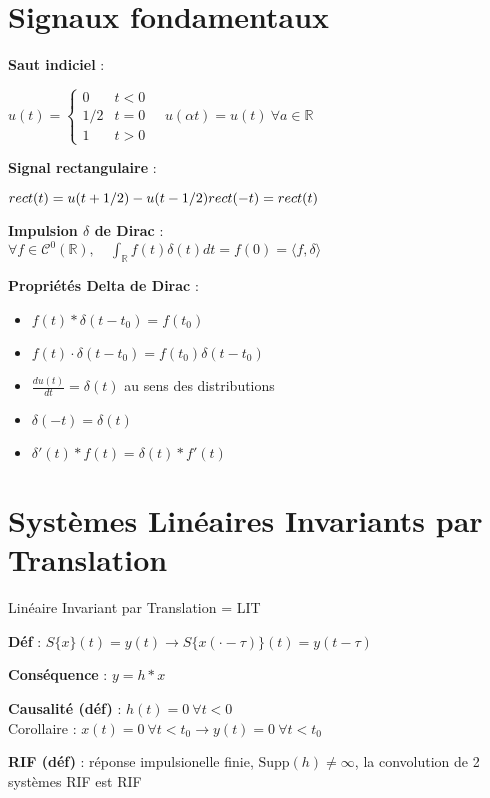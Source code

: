 \section{Signaux fondamentaux}

\textbf{Saut indiciel} : 

$
u(t) = 
\begin{cases}
0 & t < 0 \\
1/2 & t = 0 \\
1 & t > 0
\end{cases}
\quad
u(\alpha t) = u(t) \: \forall a \in \mathbb{R}
$

\textbf{Signal rectangulaire} : 

$
rect(t) = u(t + 1/2) - u(t-1/2)\\
rect(-t) = rect(t)
$

\textbf{Impulsion $\delta$ de Dirac} : \\
$
\forall f \in \mathcal{C}^0 (\mathbb{R}), 
\quad 
\int_\mathbb{R} f(t) \delta(t) dt = f(0) = \langle f, \delta \rangle
$

\textbf{Propriétés Delta de Dirac} : 
\begin{itemize}
    \item $f(t) * \delta(t-t_0) = f(t_0)$
    \item $f(t) \cdot \delta(t-t_0) = f(t_0) \delta(t-t_0)$
    \item $\frac{du(t)}{dt} = \delta(t)$ au sens des distributions
    \item $\delta(-t) = \delta(t)$
    \item $\delta'(t) * f(t) = \delta(t) * f'(t)$
\end{itemize}


\section{Systèmes Linéaires Invariants par Translation}

Linéaire Invariant par Translation = LIT

\textbf{Déf} : $S\{x\}(t) = y(t) \rightarrow S\{x(\cdot - \tau) \}(t) = y(t - \tau)$

\textbf{Conséquence} : $y = h * x$

\textbf{Causalité (déf)} : $h(t) = 0 \: \forall t < 0$\\
Corollaire : $x(t) = 0 \: \forall t < t_0 \rightarrow y(t) = 0 \: \forall t < t_0$

\textbf{RIF (déf)} : réponse impulsionelle finie, $\text{Supp}(h) \neq \infty$, la convolution de 2 systèmes RIF est RIF

